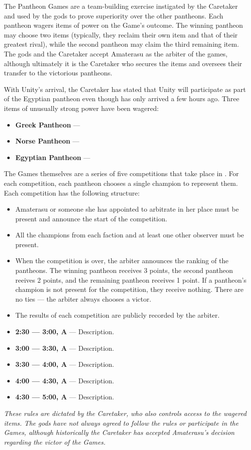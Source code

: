 \documentclass[green]{guardians}
\begin{document}
\name{\gPantheonGames{}}

The Pantheon Games are a team-building exercise instigated by the Caretaker and used by the gods to prove superiority over the other pantheons. Each pantheon wagers items of power on the Game's outcome. The winning pantheon may choose two items (typically, they reclaim their own item and that of their greatest rival), while the second pantheon may claim the third remaining item. The gods and the Caretaker accept Amaterasu as the arbiter of the games, although ultimately it is the Caretaker who secures the items and oversees their transfer to the victorious pantheons.

With Unity's arrival, the Caretaker has stated that Unity will participate as part of the Egyptian pantheon even though \cUnity{\they} has only arrived a few hours ago. Three items of unusually strong power have been wagered:

\begin{itemize}
  \item \textbf{Greek Pantheon} --- \iSandals{}
  \item \textbf{Norse Pantheon} --- \iHammer{}
	\item \textbf{Egyptian Pantheon} --- \iNecro{}
\end{itemize}

The Games themselves are a series of five competitions that take place in \pAmphitheater{}. For each competition, each pantheon chooses a single champion to represent them.
Each competition has the following structure:

\begin{itemize}
  \item Amaterasu or someone she has appointed to arbitrate in her place must be present and announce the start of the competition.
	\item All the champions from each faction and at least one other observer must be present.
	\item When the competition is over, the arbiter announces the ranking of the pantheons. The winning pantheon receives 3 points, the second pantheon reeives 2 points, and the remaining pantheon receives 1 point. If a pantheon's champion is not present for the competition, they receive nothing. There are no ties --- the arbiter always chooses a victor.
	\item The results of each competition are publicly recorded by the arbiter.
\end{itemize}

\begin{itemize}
  \item \textbf{2:30 --- 3:00, A} --- Description.
	\item \textbf{3:00 --- 3:30, A} --- Description.
	\item \textbf{3:30 --- 4:00, A} --- Description.
	\item \textbf{4:00 --- 4:30, A} --- Description.
	\item \textbf{4:30 --- 5:00, A} --- Description.
\end{itemize}

\emph{These rules are dictated by the Caretaker, who also controls access to the wagered items. The gods have not always agreed to follow the rules or participate in the Games, although historically the Caretaker has accepted Amaterasu's decision regarding the victor of the Games.}
\end{document}
